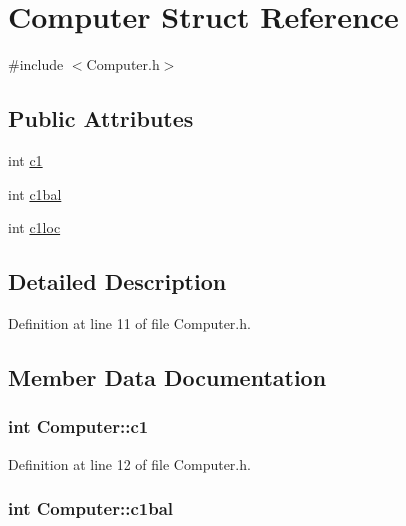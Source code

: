 \hypertarget{struct_computer}{}\section{Computer Struct Reference}
\label{struct_computer}


{\ttfamily \#include $<$Computer.\+h$>$}

\subsection*{Public Attributes}
\begin{DoxyCompactItemize}
\item 
int \hyperlink{struct_computer_a85ce939f0fdd4e7544ec392ac957018b}{c1}
\item 
int \hyperlink{struct_computer_af71ed9c8ca44bf1feecdc1ef04841167}{c1bal}
\item 
int \hyperlink{struct_computer_a1799e7ad4060c0f18e4402f92e6194e0}{c1loc}
\end{DoxyCompactItemize}


\subsection{Detailed Description}


Definition at line 11 of file Computer.\+h.



\subsection{Member Data Documentation}
\hypertarget{struct_computer_a85ce939f0fdd4e7544ec392ac957018b}{}
\subsubsection[{c1}]{\setlength{\rightskip}{0pt plus 5cm}int Computer\+::c1}\label{struct_computer_a85ce939f0fdd4e7544ec392ac957018b}


Definition at line 12 of file Computer.\+h.

\hypertarget{struct_computer_af71ed9c8ca44bf1feecdc1ef04841167}{}
\subsubsection[{c1bal}]{\setlength{\rightskip}{0pt plus 5cm}int Computer\+::c1bal}\label{struct_computer_af71ed9c8ca44bf1feecdc1ef04841167}


